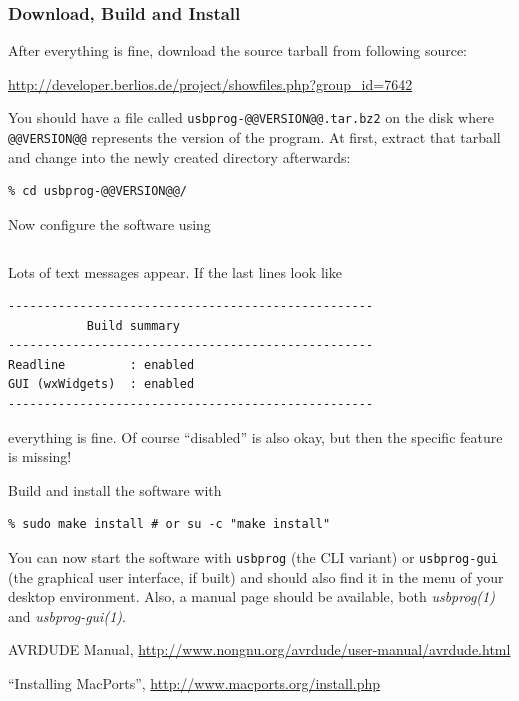 \documentclass[bibtotoc,UKenglish,halfparskip,oneside,DIV12]{scrreprt}
\begin{document}
\subsubsection{Download, Build and Install}

After everything is fine, download the source tarball from following source:

 \url{http://developer.berlios.de/project/showfiles.php?group_id=7642}

You should have a file called \texttt{usbprog-@@VERSION@@.tar.bz2} on the disk where
\texttt{@@VERSION@@} represents the version of the program. At first, extract that tarball and
change into the newly created directory afterwards:

\begin{lstlisting}[style=inline]
% tar xvfj usbprog-@@VERSION@@.tar.bz2
% cd usbprog-@@VERSION@@/
\end{lstlisting}

Now configure the software using

\begin{lstlisting}[style=inline]
% ./configure
\end{lstlisting}

Lots of text messages appear. If the last lines look like

\begin{lstlisting}[style=inline]
---------------------------------------------------
           Build summary
---------------------------------------------------
Readline         : enabled
GUI (wxWidgets)  : enabled
---------------------------------------------------
\end{lstlisting}

everything is fine. Of course ``disabled'' is also okay, but then the specific feature is missing!

Build and install the software with

\begin{lstlisting}[style=inline]
% make
% sudo make install # or su -c "make install"
\end{lstlisting}

You can now start the software with \texttt{usbprog} (the CLI variant) or \texttt{usbprog-gui} (the
graphical user interface, if built) and should also find it in the menu of your desktop environment.
Also, a manual page should be available, both \emph{usbprog(1)} and \emph{usbprog-gui(1)}.







\begin{thebibliography}{99}
   AVRDUDE Manual,
    \url{http://www.nongnu.org/avrdude/user-manual/avrdude.html}

   ``Installing MacPorts'', \url{http://www.macports.org/install.php}
\end{thebibliography}
\end{document}
